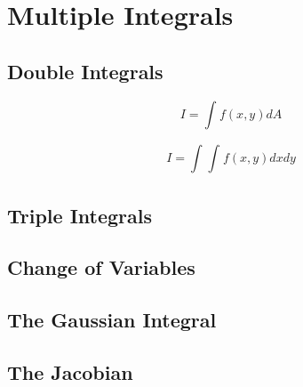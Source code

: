 \chapter{Multiple Integrals}

\section{Double Integrals}

\begin{equation*}
    I = \int_{}^{}f(x,y)dA
\end{equation*}

\begin{equation*}
    I = \int_{}^{}\int_{}^{}f(x,y)dxdy
\end{equation*}

\section{Triple Integrals}

\section{Change of Variables}

\section{The Gaussian Integral}

\section{The Jacobian}